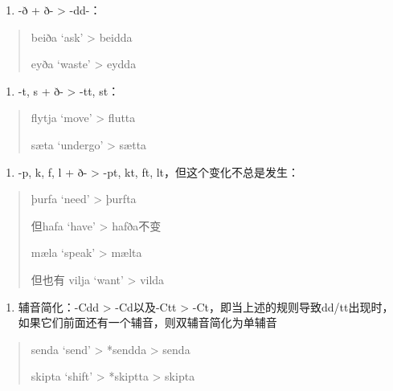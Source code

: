 \begin{enumerate}
  \def\labelenumi{\arabic{enumi})}
  \setcounter{enumi}{2}
  \item
        -ð + ð- \textgreater{} -dd-：
\end{enumerate}

\begin{quote}
  beiða `ask' \textgreater{} beidda

  eyða `waste' \textgreater{} eydda
\end{quote}

\begin{enumerate}
  \def\labelenumi{\arabic{enumi})}
  \setcounter{enumi}{3}
  \item
        -t, s + ð- \textgreater{} -tt, st：
\end{enumerate}

\begin{quote}
  flytja `move‌' \textgreater{} flutta

  sæta `undergo‌' \textgreater{} sætta
\end{quote}

\begin{enumerate}
  \def\labelenumi{\arabic{enumi})}
  \setcounter{enumi}{4}
  \item
        -p, k, f, l + ð- \textgreater{} -pt, kt, ft,
        lt，但这个变化不总是发生：
\end{enumerate}

\begin{quote}
  þurfa `need‌' \textgreater{} þurfta

  但hafa `have‌' \textgreater{} hafða不变

  mæla `speak‌' \textgreater{} mælta

  但也有 vilja `want‌' \textgreater{} vilda
\end{quote}

\begin{enumerate}
  \def\labelenumi{\arabic{enumi})}
  \setcounter{enumi}{5}
  \item
        辅音简化：-Cdd \textgreater{} -Cd以及-Ctt \textgreater{}
        -Ct，即当上述的规则导致dd/tt出现时，如果它们前面还有一个辅音，则双辅音简化为单辅音
\end{enumerate}

\begin{quote}
  senda `send‌' \textgreater{} *sendda \textgreater{} senda

  skipta `shift‌' \textgreater{} *skiptta \textgreater{} skipta
\end{quote}

